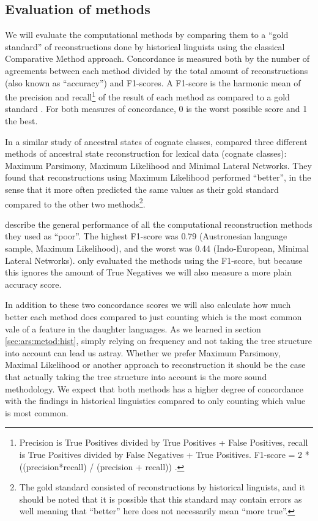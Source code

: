 \documentclass[a4paper,10pt]{article} %
\begin{document}
\subsection{Evaluation of methods}
We will evaluate the computational methods by comparing them to a ``gold standard'' of reconstructions done by historical linguists using the classical Comparative Method approach. Concordance is measured both by the number of agreements between each method divided by the total amount of reconstructions (also known as ``accuracy'') and F1-scores. A F1-score is the harmonic mean of the precision and recall\footnote{Precision is True Positives divided by True Positives + False Positives, recall is True Positives divided by False Negatives + True Positives. F1-score = 2 * ((precision*recall) / (precision + recall)) \citep{van1979information}.} of the result of each method as compared to a gold standard \citep[133]{van1979information}. For both measures of concordance, 0 is the worst possible score and 1 the best. 

In a similar study of ancestral states of cognate classes, \citet{jager2018using} compared three different methods of ancestral state reconstruction for lexical data (cognate classes): Maximum Parsimony, Maximum Likelihood and Minimal Lateral Networks. They found that reconstructions using Maximum Likelihood performed ``better'', in the sense that it more often predicted the same values as their gold standard compared to the other two methods\footnote{ The gold standard consisted of reconstructions by historical linguists, and it should be noted that it is possible that this standard may contain errors as well meaning that ``better'' here does not necessarily mean ``more true''.}. 

\citet{jager2018using} describe the general performance of all the computational reconstruction methods they used as ``poor''. The highest F1-score was 0.79 (Austronesian language sample, Maximum Likelihood), and the worst was 0.44 (Indo-European, Minimal Lateral Networks). \citet{jager2018using} only evaluated the methods using the F1-score, but because this ignores the amount of True Negatives we will also measure a more plain accuracy score. 

In addition to these two concordance scores we will also calculate how much better each method does compared to just counting which is the most common vale of a feature in the daughter languages. As we learned in section \ref{sec:ars:metod:hist}, simply relying on frequency and not taking the tree structure into account can lead us astray. Whether we prefer Maximum Parsimony, Maximal Likelihood or another approach to reconstruction it should be the case that actually taking the tree structure into account is the more sound methodology. We expect that both methods has a higher degree of concordance with the findings in historical linguistics compared to only counting which value is most common.
\end{document}
